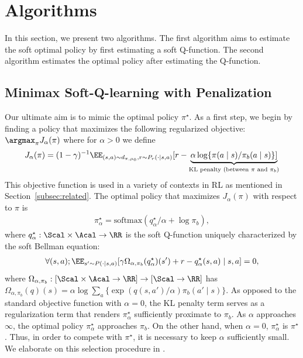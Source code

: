 
\section{Algorithms}\label{sec:motivation}


In this section, we present two algorithms. {\newedit The first algorithm aims to estimate the soft optimal policy by first estimating a soft Q-function. The second algorithm estimates the optimal policy after estimating the Q-function.}


\subsection{Minimax Soft-Q-learning with Penalization}
Our ultimate aim is to mimic the optimal policy $\pi^{\star}$. As a first step, we begin by finding a policy that maximizes the following regularized objective: 
 $  \argmax_{\pi} J_{\alpha}(\pi)$ where for $\alpha>0$ we define
\begin{align*}
 J_{\alpha}(\pi)=(1-\gamma)^{-1}\EE_{(s,a)\sim d_{\pi,\mu_0},r\sim P_r(\cdot \mid s,a)}[r-\underbrace{\alpha \log \{\pi(a\mid s)/\pi_b(a\mid s)\}]}_{\text{KL penalty (between $\pi$ and $\pi_b$)}} 
\end{align*} %
This objective function is used in a variety of contexts in RL as mentioned in Section~\ref{subsec:related}. The optimal policy that maximizes $J_{\alpha}(\pi)$ with respect to $\pi$  is  
\begin{align}\label{eq:softmax_optimal}
    \pi^{\star}_{\alpha}=\mathrm{softmax}(q^{\star}_{\alpha}/\alpha + \log \pi_b),
\end{align}
where $q^{\star}_{\alpha}:\Scal \times \Acal \to \RR$ is the soft Q-function uniquely characterized by the soft Bellman equation:
\begin{align*}
\forall (s,a);\EE_{s'\sim P(\cdot \mid s,a)}[\gamma \Omega_{\alpha,\pi_b}(q^{\star}_{\alpha})(s')+r-q^{\star}_{\alpha}(s,a) \mid s,a ]=0,
\end{align*}
where $\Omega_{\alpha,\pi_b}:[\Scal\times \Acal \to \RR]\to[\Scal \to \RR]$ has $
    \Omega_{\alpha,\pi_b}(q)(s)= \alpha \log \sum_{a}\{\exp(q(s,a')/\alpha)\pi_b(a' \mid s) \}. $
As opposed to the standard objective function with $\alpha=0$, the KL penalty term serves as a regularization term that renders $\pi^{\star}_{\alpha}$ sufficiently proximate to $\pi_b$. As $\alpha$ approaches $\infty$, the optimal policy $\pi^{\star}_{\alpha}$ approaches $\pi_b$. %
On the other hand, when $\alpha=0$, $\pi^{\star}_{\alpha}$ is $\pi^{\star}$. Thus, in order to compete with $\pi^{\star}$, it is necessary to keep $\alpha$ sufficiently small. We elaborate on this selection procedure in . 

